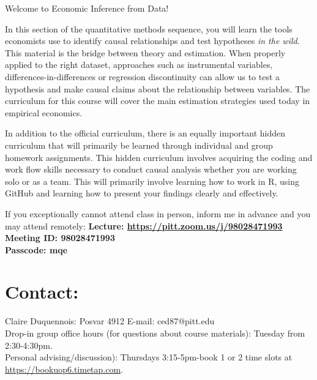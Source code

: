 \documentclass[a4paper, 10pt]{article}
\begin{document}
\begin{center}
Welcome to Economic Inference from Data!\\
\end{center}



In this section of the quantitative methods sequence, you will learn the tools economists use to identify causal relationships and test hypotheses \textit{in the wild}. This material is the bridge between theory and estimation. When properly applied to the right dataset, approaches such as instrumental variables, differences-in-differences or regression discontinuity can allow us to test a hypothesis and make causal claims about the relationship between variables. The curriculum for this course will cover the main estimation strategies used today in empirical economics. 

In addition to the official curriculum, there is an equally important hidden curriculum that will primarily be learned through individual and group homework assignments. This hidden curriculum involves acquiring the coding and work flow skills necessary to conduct causal analysis whether you are working solo or as a team. This will primarily involve learning how to work in R, using GitHub and learning how to present your findings clearly and effectively.


\noindent If you exceptionally cannot attend class in person, inform me in advance and you may attend remotely: 
\noindent\textbf{Lecture: \href{ https://pitt.zoom.us/j/98028471993}{https://pitt.zoom.us/j/98028471993}\\
Meeting ID: 98028471993\\
Passcode: mqe\\}


\section*{Contact:}


\normalsize \noindent Claire Duquennois: Posvar 4912  E-mail: ced87@pitt.edu\\
Drop-in group office hours (for questions about course materials): Tuesday from 2:30-4:30pm. \\
Personal advising/discussion): Thursdays 3:15-5pm-book 1 or 2 time slots at \href{ https://bookuop6.timetap.com}{https://bookuop6.timetap.com}.
\end{document}

